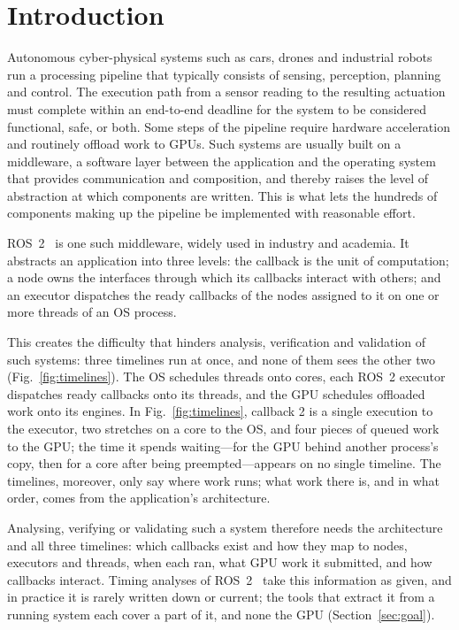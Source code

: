 \section{Introduction}
\label{sec:intro}
Autonomous cyber-physical systems such as cars, drones and industrial robots run a processing pipeline that typically consists of sensing, perception, planning and control. The execution path from a sensor reading to the resulting actuation must complete within an end-to-end deadline for the system to be considered functional, safe, or both. Some steps of the pipeline require hardware acceleration and routinely offload work to GPUs. Such systems are usually built on a middleware, a software layer between the application and the operating system that provides communication and composition, and thereby raises the level of abstraction at which components are written. This is what lets the hundreds of components making up the pipeline be implemented with reasonable effort.

ROS~2~\cite{ros2-standard} is one such middleware, widely used in industry and academia. It abstracts an application into three levels: the callback is the unit of computation; a node owns the interfaces through which its callbacks interact with others; and an executor dispatches the ready callbacks of the nodes assigned to it on one or more threads of an OS process.

This creates the difficulty that hinders analysis, verification and validation of such systems: three timelines run at once, and none of them sees the other two (Fig.~\ref{fig:timelines}). The OS schedules threads onto cores, each ROS~2 executor dispatches ready callbacks onto its threads, and the GPU schedules offloaded work onto its engines. In Fig.~\ref{fig:timelines}, callback 2 is a single execution to the executor, two stretches on a core to the OS, and four pieces of queued work to the GPU; the time it spends waiting---for the GPU behind another process's copy, then for a core after being preempted---appears on no single timeline. The timelines, moreover, only say where work runs; what work there is, and in what order, comes from the application's architecture.

Analysing, verifying or validating such a system therefore needs the architecture and all three timelines: which callbacks exist and how they map to nodes, executors and threads, when each ran, what GPU work it submitted, and how callbacks interact. Timing analyses of ROS~2~\cite{casini-19-reservationbased,arafat-2026-mtexecutor-cbgroups,teper-2024-end2endmtexecutoranalysisoptimization} take this information as given, and in practice it is rarely written down or current; the tools that extract it from a running system each cover a part of it, and none the GPU (Section~\ref{sec:goal}).

